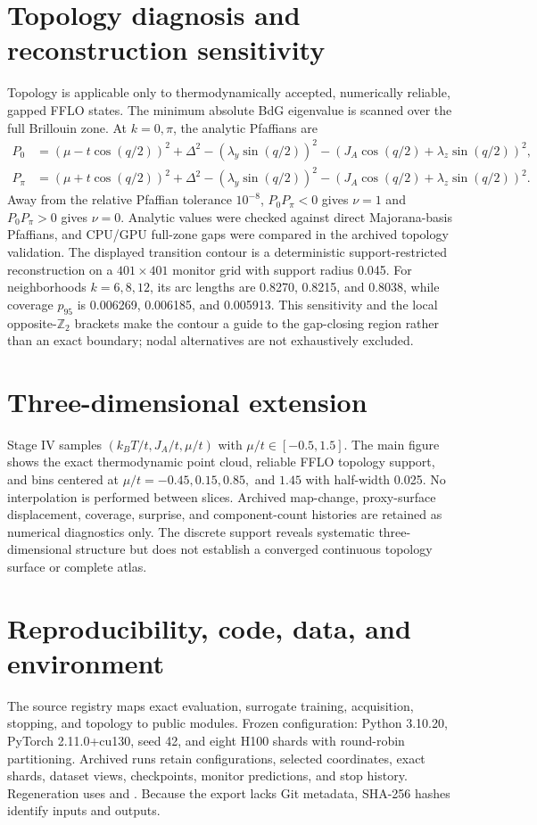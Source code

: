 \section{Topology diagnosis and reconstruction sensitivity}
Topology is applicable only to thermodynamically accepted, numerically reliable, gapped FFLO states.  The minimum absolute BdG eigenvalue is scanned over the full Brillouin zone.  At $k=0,\pi$, the analytic Pfaffians are
\begin{align}P_0&=(\mu-t\cos(q/2))^2+\Delta^2-(\lambda_y\sin(q/2))^2-(J_A\cos(q/2)+\lambda_z\sin(q/2))^2,\\P_\pi&=(\mu+t\cos(q/2))^2+\Delta^2-(\lambda_y\sin(q/2))^2-(J_A\cos(q/2)+\lambda_z\sin(q/2))^2.\end{align}
Away from the relative Pfaffian tolerance $10^{-8}$, $P_0P_\pi<0$ gives $\nu=1$ and $P_0P_\pi>0$ gives $\nu=0$. Analytic values were checked against direct Majorana-basis Pfaffians, and CPU/GPU full-zone gaps were compared in the archived topology validation. The displayed transition contour is a deterministic support-restricted reconstruction on a $401\times401$ monitor grid with support radius 0.045.  For neighborhoods $k=6,8,12$, its arc lengths are 0.8270, 0.8215, and 0.8038, while coverage $p_{95}$ is 0.006269, 0.006185, and 0.005913. This sensitivity and the local opposite-$\mathbb Z_2$ brackets make the contour a guide to the gap-closing region rather than an exact boundary; nodal alternatives are not exhaustively excluded.

\section{Three-dimensional extension}
Stage IV samples $(k_BT/t,J_A/t,\mu/t)$ with $\mu/t\in[-0.5,1.5]$. The main figure shows the exact thermodynamic point cloud, reliable FFLO topology support, and bins centered at $\mu/t=-0.45,0.15,0.85,$ and $1.45$ with half-width 0.025. No interpolation is performed between slices. Archived map-change, proxy-surface displacement, coverage, surprise, and component-count histories are retained as numerical diagnostics only. The discrete support reveals systematic three-dimensional structure but does not establish a converged continuous topology surface or complete atlas.

\section{Reproducibility, code, data, and environment}
{\small The source registry maps exact evaluation, surrogate training, acquisition, stopping, and topology to public modules. Frozen configuration: Python 3.10.20, PyTorch 2.11.0+cu130, seed 42, and eight H100 shards with round-robin partitioning. Archived runs retain configurations, selected coordinates, exact shards, dataset views, checkpoints, monitor predictions, and stop history. Regeneration uses  and . Because the export lacks Git metadata, SHA-256 hashes identify inputs and outputs.\par}
